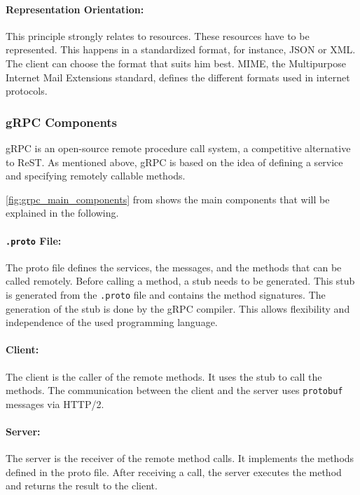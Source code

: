 \paragraph*{Representation Orientation:}
This principle strongly relates to resources.
These resources have to be represented.
This happens in a standardized format, for instance, JSON or XML.
The client can choose the format that suits him best.
MIME, the Multipurpose Internet Mail Extensions standard, defines the different formats used in internet protocols.

\subsubsection*{gRPC Components}
gRPC is an open-source remote procedure call system, a competitive alternative to ReST.
As mentioned above, gRPC is based on the idea of defining a service and specifying remotely callable methods.

\autoref{fig:grpc_main_components} from \cite{CM-T-DES} shows the main components that will be explained in the following.

\paragraph*{\texttt{.proto} File:}
The proto file defines the services, the messages, and the methods that can be called remotely.
Before calling a method, a stub needs to be generated.
This stub is generated from the \texttt{.proto} file and contains the method signatures.
The generation of the stub is done by the gRPC compiler.
This allows flexibility and independence of the used programming language.

\paragraph*{Client:}
The client is the caller of the remote methods.
It uses the stub to call the methods.
The communication between the client and the server uses \texttt{protobuf} messages via HTTP/2.

\paragraph*{Server:}
The server is the receiver of the remote method calls.
It implements the methods defined in the proto file.
After receiving a call, the server executes the method and returns the result to the client.

